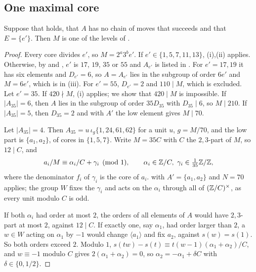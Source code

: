 \subsection{One maximal core}

\begin{proposition}\label{prop:onecore}
Suppose that  holds, that $A$ has no chain of moves that
succeeds and that $E=\{e'\}$. Then $M$ is one of the levels of
.
\end{proposition}

\begin{proof}
Every core divides $e'$, so $M=2^{a}3^{b}e'$. If $e'\in\{1,5,7,11,13\}$,
(i),(ii) applies. Otherwise, by  and
, $e'$ is $17$, $19$, $35$ or $55$ and $A_{e'}$ is listed in
. For $e'=17,19$ it has six elements and $D_{e'}=6$, so
$A=A_{e'}$ lies in the subgroup of order $6e'$ and $M=6e'$, which is in
(iii). For $e'=55$, $D_{e'}=2$ and $110\mid M$, which is
excluded. Let $e'=35$. If $420\nmid M$, (i) applies; we
show that $420\mid M$ is impossible. If $|A_{35}|=6$, then $A$ lies in the
subgroup of order $35D_{35}$ with $D_{35}\mid6$, so $M\mid210$. If
$|A_{35}|=5$, then $D_{35}=2$ and  with $A'$ the
low element gives $M\mid70$.

Let $|A_{35}|=4$. Then $A_{35}=u\,\iota_{g}\{1,24,61,62\}$ for a unit $u$,
$g=M/70$, and the low part is $\{a_{1},a_{2}\}$, of cores in $\{1,5,7\}$.
Write $M=35C$ with $C$ the $2,3$-part of $M$, so $12\mid C$, and
\[
  a_{i}/M\equiv\alpha_{i}/C+\gamma_{i}\pmod 1,\qquad \alpha_{i}\in\mathbb{Z}/C,\
  \gamma_{i}\in\tfrac{1}{35}\mathbb{Z}/\mathbb{Z},
\]
where the denominator $f_{i}$ of $\gamma_{i}$ is the core of $a_{i}$.
\Cref{lem:lowinvariance} with $A'=\{a_{1},a_{2}\}$ and $N=70$ applies; the
group $W$ fixes the $\gamma_{i}$ and acts on the $\alpha_{i}$ through all of
$(\mathbb{Z}/C)^{\times}$, as every unit modulo $C$ is odd.

If both $\alpha_{i}$ had order at most $2$, the orders of all elements of $A$
would have $2,3$-part at most $2$, against $12\mid C$. If exactly one, say
$\alpha_{1}$, had order larger than $2$, a $w\in W$ acting on $\alpha_{1}$ by
$-1$ would change $\langle a_{1}\rangle$ and fix $a_{2}$, against
$s(w)=s(1)$. So both orders exceed $2$. Modulo $1$,
$s(tw)-s(t)\equiv t(w-1)(\alpha_{1}+\alpha_{2})/C$, and $w\equiv-1$ modulo $C$
gives $2(\alpha_{1}+\alpha_{2})=0$, so $\alpha_{2}=-\alpha_{1}+\delta C$ with
$\delta\in\{0,1/2\}$.


\end{proof}
